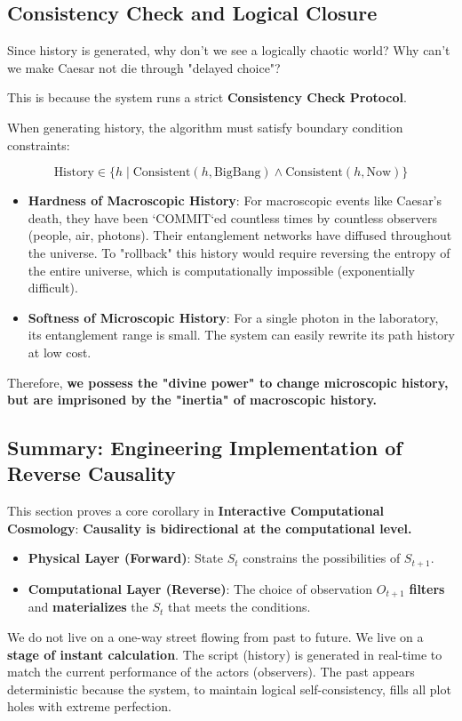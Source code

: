 \subsection{Consistency Check and Logical Closure}

Since history is generated, why don't we see a logically chaotic world? Why can't we make Caesar not die through "delayed choice"?

This is because the system runs a strict \textbf{Consistency Check Protocol}.

When generating history, the algorithm must satisfy boundary condition constraints:

\begin{equation}
\text{History} \in \{ h \mid \text{Consistent}(h, \text{BigBang}) \land \text{Consistent}(h, \text{Now}) \}
\end{equation}

\begin{itemize}
\item \textbf{Hardness of Macroscopic History}: For macroscopic events like Caesar's death, they have been `COMMIT`ed countless times by countless observers (people, air, photons). Their entanglement networks have diffused throughout the universe. To "rollback" this history would require reversing the entropy of the entire universe, which is computationally impossible (exponentially difficult).

\item \textbf{Softness of Microscopic History}: For a single photon in the laboratory, its entanglement range is small. The system can easily rewrite its path history at low cost.
\end{itemize}

Therefore, \textbf{we possess the "divine power" to change microscopic history, but are imprisoned by the "inertia" of macroscopic history.}

\subsection{Summary: Engineering Implementation of Reverse Causality}

This section proves a core corollary in \textbf{Interactive Computational Cosmology}: \textbf{Causality is bidirectional at the computational level.}

\begin{itemize}
\item \textbf{Physical Layer (Forward)}: State $S_t$ constrains the possibilities of $S_{t+1}$.

\item \textbf{Computational Layer (Reverse)}: The choice of observation $O_{t+1}$ \textbf{filters} and \textbf{materializes} the $S_t$ that meets the conditions.
\end{itemize}

We do not live on a one-way street flowing from past to future. We live on a \textbf{stage of instant calculation}. The script (history) is generated in real-time to match the current performance of the actors (observers). The past appears deterministic because the system, to maintain logical self-consistency, fills all plot holes with extreme perfection.
